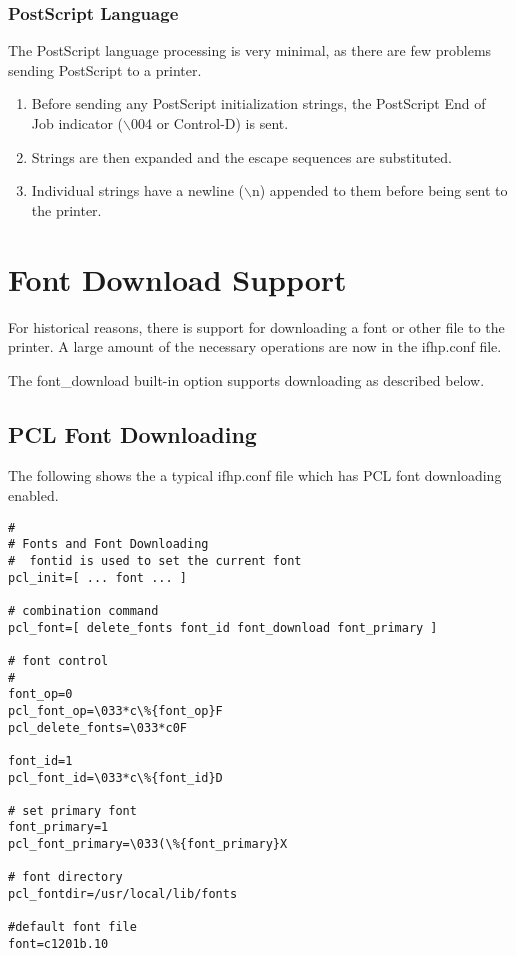 \documentclass[a4paper]{article}
\begin{document}
\subsubsection{PostScript Language}

The PostScript language processing is very minimal,
as there are few problems sending PostScript to a printer.
\begin{enumerate}
\item Before sending any PostScript initialization strings,
the PostScript End of Job indicator
({\ttfamily $\backslash$004} or Control-D) is sent.
\item Strings are then expanded and the escape sequences are substituted.
\item Individual strings have a newline
({\ttfamily $\backslash$n}) appended to them before being sent to the printer.
\end{enumerate}



\section{Font Download Support}

For historical reasons,
there is support for downloading a font or other file to the
printer.
A large amount of the necessary operations are now in the
{\ttfamily ifhp.conf}
file.

The
{\ttfamily font\_download}
built-in option supports downloading as described below.


\subsection{PCL Font Downloading}

The following shows the a typical
{\ttfamily ifhp.conf}
file which has PCL font downloading enabled.
\begin{tscreen}
\begin{verbatim}
#
# Fonts and Font Downloading
#  fontid is used to set the current font
pcl_init=[ ... font ... ]

# combination command
pcl_font=[ delete_fonts font_id font_download font_primary ]

# font control
#
font_op=0
pcl_font_op=\033*c\%{font_op}F
pcl_delete_fonts=\033*c0F

font_id=1
pcl_font_id=\033*c\%{font_id}D

# set primary font
font_primary=1
pcl_font_primary=\033(\%{font_primary}X

# font directory
pcl_fontdir=/usr/local/lib/fonts

#default font file
font=c1201b.10
\end{verbatim}
\end{tscreen}
\end{document}
